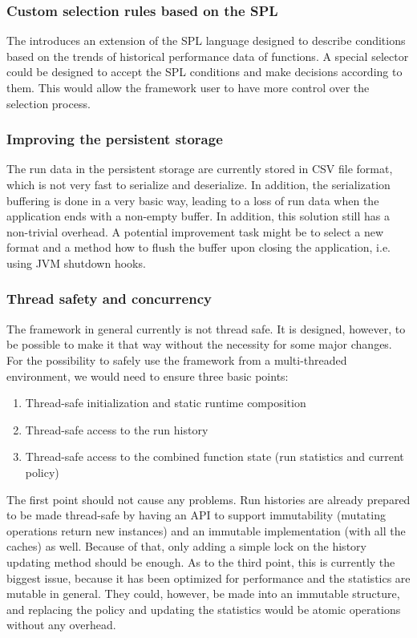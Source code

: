 \subsubsection{Custom selection rules based on the SPL}

The \cite{bulej_performance_2012} introduces an extension of the SPL language designed to describe conditions based on the trends of historical performance data of functions. A special selector could be designed to accept the SPL conditions and make decisions according to them. This would allow the framework user to have more control over the selection process. 

\subsubsection{Improving the persistent storage}

The run data in the persistent storage are currently stored in CSV file format, which is not very fast to serialize and deserialize. In addition, the serialization buffering is done in a very basic way, leading to a loss of run data when the application ends with a non-empty buffer. In addition, this solution still has a non-trivial overhead. A potential improvement task might be to select a new format and a method how to flush the buffer upon closing the application, i.e. using JVM shutdown hooks.

\subsubsection{Thread safety and concurrency}

The framework in general currently is not thread safe. It is designed, however, to be possible to make it that way without the necessity for some major changes. For the possibility to safely use the framework from a multi-threaded environment, we would need to ensure three basic points:

\begin{enumerate}
	\item Thread-safe initialization and static runtime composition
	\item Thread-safe access to the run history
	\item Thread-safe access to the combined function state (run statistics and current policy)
\end{enumerate}

The first point should not cause any problems. Run histories are already prepared to be made thread-safe by having an API to support immutability (mutating operations return new instances) and an immutable implementation (with all the caches) as well. Because of that, only adding a simple lock on the history updating method should be enough. As to the third point, this is currently the biggest issue, because it has been optimized for performance and the statistics are mutable in general. They could, however, be made into an immutable structure, and replacing the policy and updating the statistics would be atomic operations without any overhead.

